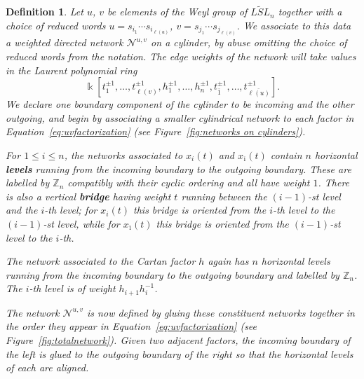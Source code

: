\documentclass[12pt]{amsart}
\newcommand{\newword}[1]{\textbf{\emph{#1}}}
\newcommand{\ZZ}{\mathbb{Z}}
\newcommand{\kk}{\Bbbk}
\newcommand{\cN}{\mathcal{N}} %
\newcommand{\ol}[1]{\overline{#1}}
\newtheorem{definition}[theorem]{Definition}
\theoremstyle{remark}
\numberwithin{equation}{section}
\numberwithin{figure}{section}
\begin{document}
\begin{definition}
  \label{def:network}
  Let $u$, $v$ be elements of the Weyl group of $\widetilde{LSL}_n$ together with a choice of reduced words $u=s_{i_1}\cdots s_{i_{\ell(u)}}$, $v=s_{j_1}\cdots s_{j_{\ell(v)}}$.
  We associate to this data a weighted directed network $\cN^{u,v}$ on a cylinder, by abuse omitting the choice of reduced words from the notation.
  The edge weights of the network will take values in the Laurent polynomial ring
  \[
    \kk[t_{1}^{\pm1},\dotsc,t_{\ell(v)}^{\pm 1},h_1^{\pm 1},\dotsc,h_{n}^{\pm 1},t_{\ol{1}}^{\pm 1},\dotsc,t_{\ol{\ell(u)}}^{\pm 1}].
  \]
  We declare one boundary component of the cylinder to be incoming and the other outgoing, and begin by associating a smaller cylindrical network to each factor in Equation~\eqref{eq:uvfactorization} (see Figure~\ref{fig:networks on cylinders}).

  For $1 \leq i \leq n$, the networks associated to $x_i(t)$ and $x_{\ol{\imath}}(t)$ contain $n$ horizontal \newword{levels} running from the incoming boundary to the outgoing boundary.
  These are labelled by $\ZZ_n$ compatibly with their cyclic ordering and all have weight $1$.
  There is also a vertical \newword{bridge} having weight $t$ running between the $(i-1)$-st level and the $i$-th level; for $x_i(t)$ this bridge is oriented from the $i$-th level to the $(i-1)$-st level, while for $x_{\ol{\imath}}(t)$ this bridge is oriented from the $(i-1)$-st level to the $i$-th.

  The network associated to the Cartan factor $h$ again has $n$ horizontal levels running from the incoming boundary to the outgoing boundary and labelled by $\ZZ_n$.
  The $i$-th level is of weight $h_{i+1}h_{i}^{-1}$.

  The network $\cN^{u,v}$ is now defined by gluing these constituent networks together in the order they appear in Equation~\eqref{eq:uvfactorization} (see Figure~\ref{fig:totalnetwork}).
  Given two adjacent factors, the incoming boundary of the left is glued to the outgoing boundary of the right so that the horizontal levels of each are aligned.
\end{definition}
\end{document}

